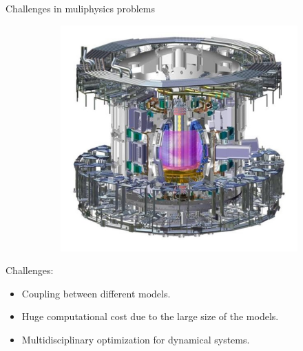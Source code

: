 \documentclass[aspectratio=169]{beamer}
\begin{document}
\begin{frame}{Challenges in muliphysics problems}
\begin{figure}[t]
\begin{subfigure}[t]{0.26\textwidth}
			\includegraphics[width=\columnwidth]{tcws.jpg}\\
		\end{subfigure}
	\end{figure}
	Challenges:
	\begin{itemize}
		\item Coupling between different models.​
		\item Huge computational cost due to the large size of the models.​
		\item Multidisciplinary optimization for dynamical systems.​
	\end{itemize}
	
\end{frame}
\end{document}
